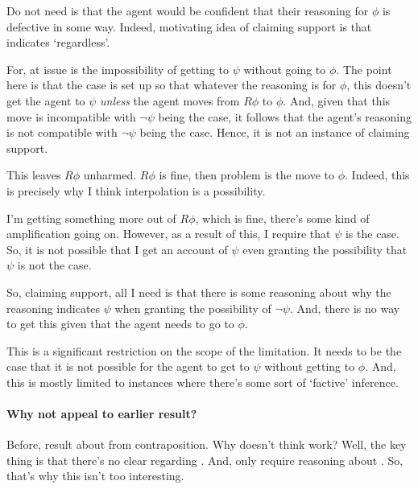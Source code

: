\begin{note}
  Do not need is that the agent would be confident that their reasoning for \(\phi\) is defective in some way.
  Indeed, motivating idea of claiming support is that indicates `regardless'.
\end{note}

\begin{note}
  {
    \color{red}
    For, at issue is the impossibility of getting to \(\psi\) without going to \(\phi\).
    The point here is that the case is set up so that whatever the reasoning is for \(\phi\), this doesn't get the agent to \(\psi\) \emph{unless} the agent moves from \(R\phi\) to \(\phi\).
    And, given that this move is incompatible with \(\lnot\psi\) being the case, it follows that the agent's reasoning is not compatible with \(\lnot\psi\) being the case.
    Hence, it is not an instance of claiming support.

    This leaves \(R\phi\) unharmed.
    \(R\phi\) is fine, then problem is the move to \(\phi\).
    Indeed, this is precisely why I think interpolation is a possibility.

    I'm getting something more out of \(R\phi\), which is fine, there's some kind of amplification going on.
    However, as a result of this, I require that \(\psi\) is the case.
    So, it is not possible that I get an account of \(\psi\) even granting the possibility that \(\psi\) is not the case.

    So, claiming support, all I need is that there is some reasoning about why the reasoning indicates \(\psi\) when granting the possibility of \(\lnot\psi\).
    And, there is no way to get this given that the agent needs to go to \(\phi\).

    This is a significant restriction on the scope of the limitation.
    It needs to be the case that it is not possible for the agent to get to \(\psi\) without getting to \(\phi\).
    And, this is mostly limited to instances where there's some sort of `factive' inference.
  }
\end{note}

\paragraph{Why not appeal to earlier result?}

\begin{note}
  Before, result about  from contraposition.
  Why doesn't think work?
  Well, the key thing is that there's no clear regarding .
  And, only require reasoning about .
  So, that's why this isn't too interesting.
\end{note}

